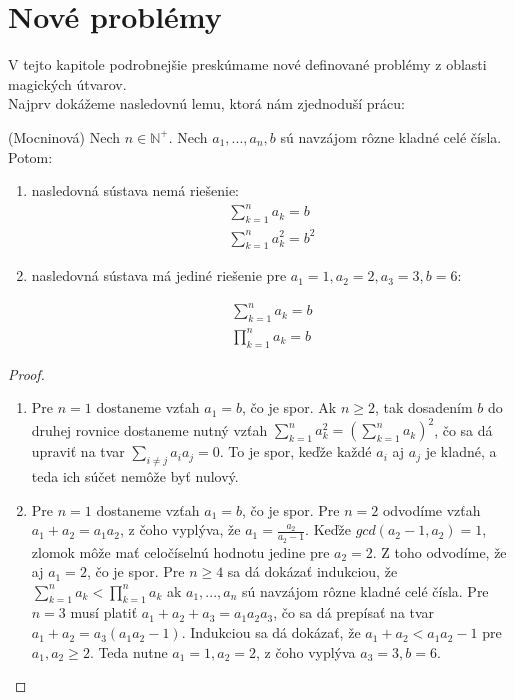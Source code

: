 \chapter{Nové problémy}

\label{kap:newproblems} %

V tejto kapitole podrobnejšie preskúmame nové definované problémy z oblasti magických útvarov. \\

Najprv dokážeme nasledovnú lemu, ktorá nám zjednoduší prácu:

\begin{lemma} (Mocninová) Nech $n \in \mathbb{N^+}$. Nech $a_1, ... , a_n , b$ sú navzájom rôzne kladné celé čísla. Potom:

\begin{enumerate}
\item nasledovná sústava nemá riešenie:
\begin{gather*}
\sum_{k=1}^{n} a_k = b \\
\sum_{k=1}^{n} a^2_k = b^2
\end{gather*}

\item nasledovná sústava má jediné riešenie pre $a_1 = 1, a_2 = 2, a_3 = 3, b = 6$:

\begin{gather*}
\sum_{k=1}^{n} a_k = b \\
\prod_{k=1}^{n} a_k = b
\end{gather*}
\end{enumerate}

\end{lemma}

\begin{proof}
\begin{enumerate}
\item Pre $n = 1$ dostaneme vzťah $a_1 = b$, čo je spor. Ak $n \geq 2$, tak dosadením $b$ do druhej rovnice dostaneme nutný vzťah $\sum_{k=1}^{n} a^2_k = (\sum_{k=1}^{n} a_k)^2$, čo sa dá upraviť na tvar $\sum_{i \neq j} a_i a_j = 0$. To je spor, keďže každé $a_i$ aj $a_j$ je kladné, a teda ich súčet nemôže byť nulový. \\

\item Pre $n = 1$ dostaneme vzťah $a_1 = b$, čo je spor. Pre $n = 2$ odvodíme vzťah $a_1 + a_2 = a_1 a_2$, z čoho vyplýva, že $a_1 = \frac{a_2}{a_2 - 1}$. Keďže $gcd(a_2 - 1, a_2) = 1$, zlomok môže mať celočíselnú hodnotu jedine pre $a_2 = 2$. Z toho odvodíme, že aj $a_1 = 2$, čo je spor. Pre $n \geq 4$ sa dá dokázať indukciou, že $\sum_{k=1}^{n} a_k < \prod_{k=1}^{n} a_k$ ak $a_1, ... , a_n$ sú navzájom rôzne kladné celé čísla. Pre $n = 3$ musí platiť $a_1 + a_2 + a_3 = a_1 a_2 a_3$, čo sa dá prepísať na tvar $a_1 + a_2 = a_3 (a_1 a_2 - 1)$. Indukciou sa dá dokázať, že $a_1 + a_2 < a_1 a_2 - 1$ pre $a_1, a_2 \geq 2$. Teda nutne $a_1 = 1, a_2 = 2$, z čoho vyplýva $a_3 = 3, b = 6$.
\end{enumerate}
\end{proof}


